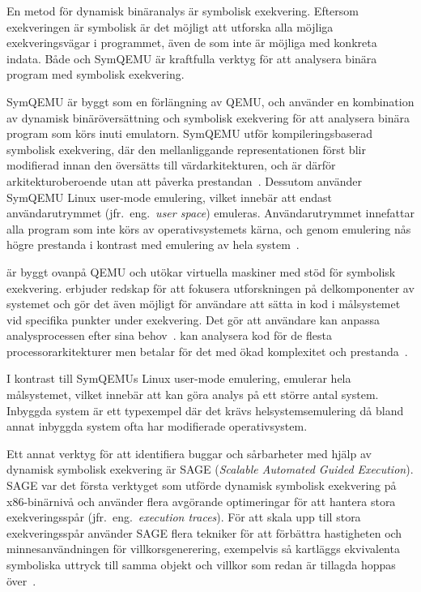 En metod för dynamisk binäranalys är symbolisk exekvering. Eftersom exekveringen är symbolisk är
det möjligt att utforska alla möjliga exekveringsvägar i programmet, även de som inte är möjliga
med konkreta indata. Både \stoe{} och SymQEMU är kraftfulla verktyg för att analysera binära program
med symbolisk exekvering.

SymQEMU är byggt som en förlängning av QEMU, och använder en kombination av
dynamisk binäröversättning och symbolisk exekvering för att analysera binära
program som körs inuti emulatorn. SymQEMU utför kompileringsbaserad symbolisk
exekvering, där den mellanliggande representationen först blir modifierad innan
den översätts till värdarkitekturen, och är därför arkitekturoberoende utan att
påverka prestandan~\cite{symqemu}. Dessutom använder SymQEMU Linux user-mode
emulering, vilket innebär att endast användarutrymmet (jfr.\ eng.\ \emph{user space})
emuleras. Användarutrymmet innefattar alla program som inte körs av
operativsystemets kärna, och genom emulering nås högre prestanda i kontrast med
emulering av hela system~\cite{symqemu}.

\stoe{} är byggt ovanpå QEMU och utökar virtuella maskiner med stöd för
symbolisk exekvering. \stoe{} erbjuder redskap för att fokusera utforskningen på
delkomponenter av systemet och gör det även möjligt för användare att sätta in
kod i målsystemet vid specifika punkter under exekvering. Det gör att användare
kan anpassa analysprocessen efter sina behov~\cite{s2e}. \stoe{} kan analysera
kod för de flesta processorarkitekturer men betalar för det med ökad komplexitet
och prestanda~\cite{symqemu}.

I kontrast till SymQEMUs Linux user-mode emulering, emulerar \stoe{} hela
målsystemet, vilket innebär att \stoe{} kan göra analys på ett större antal
system. Inbyggda system är ett typexempel där det krävs helsystemsemulering då
bland annat inbyggda system ofta har modifierade operativsystem.

Ett annat verktyg för att identifiera buggar och sårbarheter med hjälp av dynamisk symbolisk
exekvering är SAGE (\emph{Scalable Automated Guided Execution}).
SAGE var det första verktyget som utförde dynamisk symbolisk exekvering på x86-binärnivå och använder flera
avgörande optimeringar för att hantera stora exekveringsspår (jfr.\ eng.\ \emph{execution traces}).
För att skala upp till stora exekveringsspår använder SAGE flera tekniker för att förbättra hastigheten och
minnesanvändningen för villkorsgenerering, exempelvis så kartläggs ekvivalenta symboliska uttryck till samma
objekt och villkor som redan är tillagda hoppas över~\cite{sage}.

